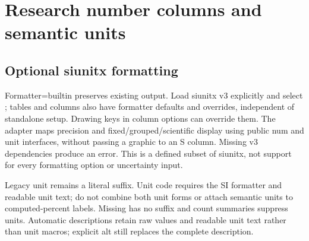 \section{Research number columns and semantic units}
\subsection{Optional siunitx formatting}
\begin{sloppypar}
Formatter=builtin preserves existing output. Load siunitx v3 explicitly and
select ; tables and columns also have formatter defaults and
overrides, independent of standalone setup. Drawing keys in column options can
override them. The adapter maps precision and fixed/grouped/scientific display
using public num and unit interfaces, without passing a graphic to an S column.
Missing v3 dependencies produce an error. This is a defined subset of siunitx,
not support for every formatting option or uncertainty input.
\end{sloppypar}
\begin{source}
\usepackage{siunitx}
\usepackage{gradbars}
\end{source}
Legacy unit remains a literal suffix. Unit code requires the SI formatter and
readable unit text; do not combine both unit forms or attach semantic units to
computed-percent labels. Missing has no suffix and count summaries suppress
units. Automatic descriptions retain raw values and readable unit text rather
than unit macros; explicit alt still replaces the complete description.
